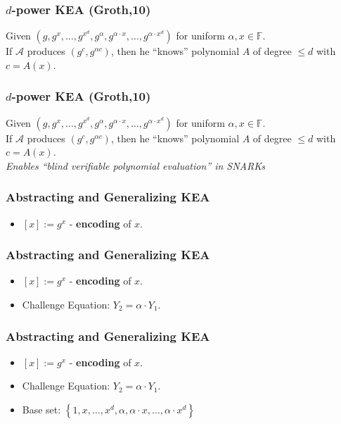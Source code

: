 \documentclass[shadesubsections,trans,14pt,mathserif]{beamer}
\newcommand{\adv}{\ensuremath{\mathcal A}}
\newcommand{\F}{\ensuremath{\mathbb F}}
\newcommand{\set}[1]{\ensuremath{\left\{#1\right\}}}
\begin{document}
\begin{frame}
  \frametitle{$d$-power KEA (Groth,10)}   %
 Given $(g,g^x,\ldots, g^{x^d},g^\alpha,g^{\alpha\cdot x},\ldots,g^{\alpha\cdot x^d})$ for uniform $\alpha,x \in \F$.\\
 \vspace{0.3in}
If $\adv$ produces $(g^c,g^{\alpha c})$,
then he ``knows'' polynomial $A$ of degree $\leq d$ with
$c=A(x)$.
 
\end{frame}
\begin{frame}
  \frametitle{$d$-power KEA (Groth,10)}   %
 Given $(g,g^x,\ldots, g^{x^d},g^\alpha,g^{\alpha\cdot x},\ldots,g^{\alpha\cdot x^d})$ for uniform $\alpha,x \in \F$.\\
 \vspace{0.3in}
If $\adv$ produces $(g^c,g^{\alpha c})$,
then he ``knows'' polynomial $A$ of degree $\leq d$ with
$c=A(x)$.\\
 \vspace{0.4in}
 \emph{Enables ``blind verifiable polynomial evaluation'' in SNARKs}
\end{frame}


\begin{frame}
 \frametitle{Abstracting and Generalizing KEA}
 \begin{itemize}
  \item $[x]:=g^x$ -  \textbf{encoding} of $x$.
  \vspace{0.3in}
 \end{itemize}
\end{frame}

\begin{frame}
 \frametitle{Abstracting and Generalizing KEA}
 \begin{itemize}
  \item $[x]:=g^x$ -  \textbf{encoding} of $x$.
  \vspace{0.3in}
  \item Challenge Equation: $Y_2=\alpha\cdot Y_1$.
   \vspace{0.3in}
 \end{itemize}
\end{frame}
\begin{frame}
 \frametitle{Abstracting and Generalizing KEA}
 \begin{itemize}
  \item $[x]:=g^x$ -  \textbf{encoding} of $x$.
  \vspace{0.3in}
  \item Challenge Equation: $Y_2=\alpha\cdot Y_1$.
   \vspace{0.3in}
\item Base set: $\set{1,x,\ldots,x^d,\alpha,\alpha\cdot x,\ldots,\alpha\cdot x^d}$
 \end{itemize}
\end{frame}
\end{document}
